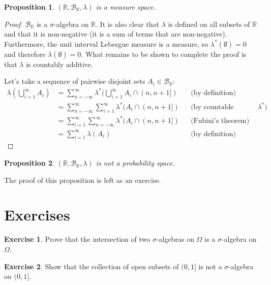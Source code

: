 \documentclass{book}
\theoremstyle{plain}%
\newtheorem{proposition}{Proposition}[section]
\theoremstyle{definition}
\newtheorem{exercise}{Exercise}[chapter]
\begin{document}
\begin{proposition} $(\mathbb{R}, \mathcal{B}_\mathbb{R}, \lambda)$ is a measure space.
\end{proposition}

\begin{proof}
$\mathcal{B}_\mathbb{R}$ is a $\sigma$-algebra on $\mathbb{R}$. It is also clear that $\lambda$ is defined on all subsets of $\mathbb{R}$ and that it is non-negative (it is a sum of terms that are non-negative). Furthermore, the unit interval Lebesgue measure is a measure, so $\lambda^*(\emptyset) = 0$ and therefore $\lambda(\emptyset) = 0$. What remains to be shown to complete the proof is that $\lambda$ is countably additive.

Let's take a sequence of pairwise disjoint sets $A_i \in \mathcal{B}_\mathbb{R}$:
\begin{align*}
    \lambda\left(\bigcup_{i=1}^\infty A_i\right) &=  \sum_{n = -\infty}^\infty \lambda^*( \bigcup_{i=1}^\infty A_i \cap (n, n+1])&& \text{(by definition)}\\
 &=  \sum_{n = -\infty}^\infty \sum_{i=1}^\infty  \lambda^*( A_i \cap (n, n+1])&& \text{(by countable additivity of $\lambda^*$)}\\
 &=  \sum_{i=1}^\infty \sum_{n = -\infty}^\infty  \lambda^*( A_i \cap (n, n+1])&& \text{(Fubini's theorem)}\\
 &= \sum_{i=1}^\infty  \lambda(A_i)&& \text{(by definition)}
\end{align*}
\end{proof}

\begin{proposition} $(\mathbb{R}, \mathcal{B}_\mathbb{R}, \lambda)$ is not a probability space.\label{prop:infinite}
\end{proposition}

The proof of this proposition is left as an exercise.

\section*{Exercises}

\begin{exercise}
Prove that the intersection of two $\sigma$-algebras on $\Omega$ is a $\sigma$-algebra on $\Omega$.
\end{exercise}

\begin{exercise}
Show that the collection of open subsets of $(0,1]$ is not a $\sigma$-algebra on $(0,1]$.\label{ex:001}
\end{exercise}
\end{document}
